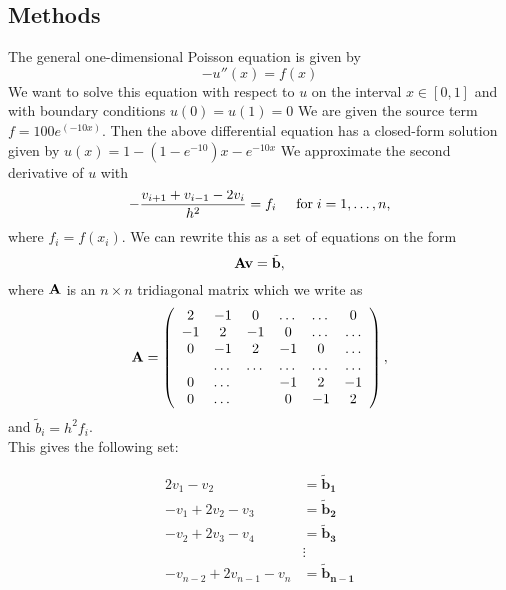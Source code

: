 \documentclass[12pt]{article}
\begin{document}
\subsection{Methods}
The general one-dimensional Poisson equation is given by 
\begin{equation}
-u''(x) = f(x)
\end{equation}
We want to solve this equation with respect to $u$ on the interval $x \in [0,1]$ and with boundary conditions $u(0) = u(1) = 0$
We are given the source term $f  = 100e^{(-10x)}$. Then the above differential equation
has a closed-form  solution given by $u(x) = 1-(1-e^{-10})x-e^{-10x}$
We  approximate the second
derivative of $u$ with 
\[
   -\frac{v_{i+1}+v_{i-1}-2v_i}{h^2} = f_i  \hspace{0.5cm} \mathrm{for} \hspace{0.1cm} i=1,\dots, n,
\]
where $f_i=f(x_i)$.
We can rewrite this as a set of equations on the form \[
   {\bf A}{\bf v} = \tilde{{\bf b}},
\]
where ${\bf A}$ is an $n\times n$  tridiagonal matrix which we write as 
\begin{equation}
    {\bf A} = \left(\begin{array}{cccccc}
                           2& -1& 0 &\dots   & \dots &0 \\
                           -1 & 2 & -1 &0 &\dots &\dots \\
                           0&-1 &2 & -1 & 0 & \dots \\
                           & \dots   & \dots &\dots   &\dots & \dots \\
                           0&\dots   &  &-1 &2& -1 \\
                           0&\dots    &  & 0  &-1 & 2 \\
                      \end{array} \right),
\end{equation}
and $\tilde{b}_i=h^2f_i$.
\\

This gives the following set:

\begin{align*}
2v_1 - v_2 &= \mathbf{\tilde{b}_1} \\
-v_1 + 2v_2 - v_3 &= \mathbf{\tilde{b}_2} \\
-v_2 + 2v_3 - v_4 &= \mathbf{\tilde{b}_3} \\
 &\vdots  \\
-v_{n-2} + 2v_{n-1} - v_{n} &= \mathbf{\tilde{b}_{n-1}}
\end{align*}
\end{document}
